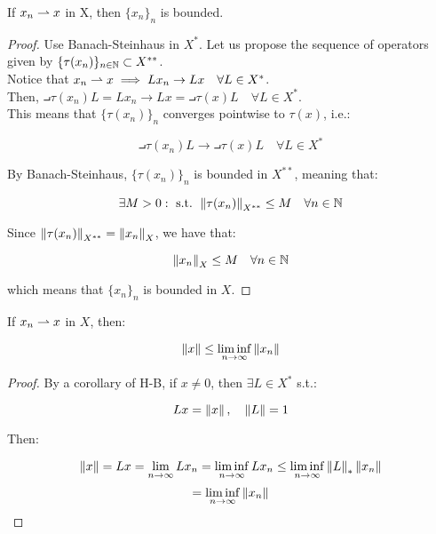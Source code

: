 \begin{fproposition}
    If $x_n \rightharpoonup x$ in X, then $\{x_n\}_n$ is bounded.
\end{fproposition}

\begin{proof}
    Use Banach-Steinhaus in $X^*$. Let us propose the
    sequence of operators given by $\{\tau(x_n)\}_{n \in \mathbb{N}} \subset X^{**}$.\\
    
    Notice that $x_n \rightharpoonup x \implies L x_n \to L x \quad \forall L \in X^*$.\\

    Then, $\intprod{\tau(x_n)}{L} = L x_n \to L x = \intprod{\tau(x)}{L} \quad \forall L \in X^*$.\\

    This means that $\{\tau(x_n)\}_n$ converges pointwise to $\tau(x)$, i.e.:

    $$\intprod{\tau(x_n)}{L} \to \intprod{\tau(x)}{L} \quad \forall L \in X^*$$

    By Banach-Steinhaus, $\{\tau(x_n)\}_n$ is bounded in $X^{**}$, meaning that:

    $$\exists M > 0: \text{ s.t. } \left\|\tau(x_n)\right\|_{X^{**}} \leq M \quad \forall n \in \mathbb{N}$$

    Since $\left\|\tau(x_n)\right\|_{X^{**}} = \left\|x_n\right\|_{X}$, we have that:

    $$\left\|x_n\right\|_{X} \leq M \quad \forall n \in \mathbb{N}$$

    which means that $\{x_n\}_n$ is bounded in $X$.

\end{proof}

\begin{fproposition}
    If $x_n \rightharpoonup x$ in $X$, then:

    $$\left\|x\right\| \leq \liminf_{n \to \infty} \left\|x_n\right\|$$
\end{fproposition}

\begin{proof}
    By a corollary of H-B, if $x \neq 0$, then $\exists L \in X^*$ s.t.:

    $$Lx = \left\|x\right\|, \quad \left\|L\right\| = 1$$

    Then:

    $$\left\|x\right\| = L x = \lim_{n \to \infty} L x_n = \liminf_{n \to \infty} L x_n \leq \liminf_{n \to \infty} \left\|L\right\|_* \left\|x_n\right\|$$
    $$= \liminf_{n \to \infty} \left\|x_n\right\|$$

\end{proof}

